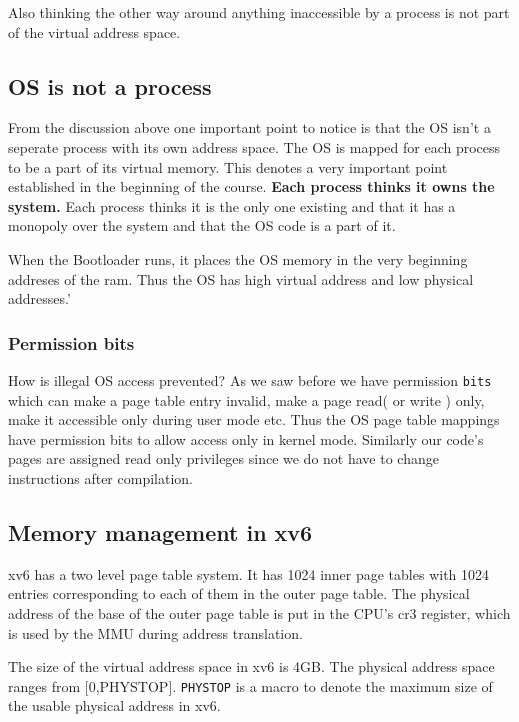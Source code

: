 \documentclass[12pt]{article}
\begin{document}
Also thinking the other way around anything inaccessible by a process is not part of the virtual address space. 

\subsection{OS is not a process}
From the discussion above one important point to notice is that the OS isn't a seperate process with its own address space. The OS is mapped for each process to be a part of its virtual memory.
This denotes a very important point established in the beginning of the course. \textbf{Each process thinks it owns the system.} Each process thinks it is the only one existing and that
it has a monopoly over the system and that the OS code is a part of it.

When the Bootloader runs, it places the OS memory in the very beginning addreses of the ram. Thus the OS has high virtual address and low physical addresses.'

\subsubsection*{Permission bits}
How is illegal OS access prevented? As we saw before we have permission \texttt{bits} which can make a page table entry invalid, make a page read( or write ) only, make it accessible only during user mode etc. 
Thus the OS page table mappings have permission bits to allow access only in kernel mode. Similarly our code's pages are assigned read only privileges since we do not have to change instructions after compilation. 

\subsection{Memory management in xv6}
xv6 has a two level page table system. It has 1024 inner page tables with 1024 entries corresponding to each of them in the 
outer page table. The physical address of the base of the outer page table is put in the CPU's cr3 register, which is used by the MMU
during address translation.

The size of the virtual address space in xv6 is 4GB. The physical address space ranges from [0,PHYSTOP]. \texttt{PHYSTOP} is a macro to denote
the maximum size of the usable physical address in xv6.
\end{document}
